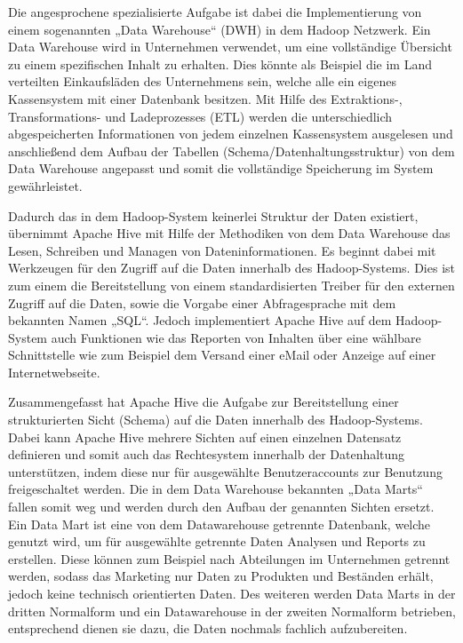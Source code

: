 Die angesprochene spezialisierte Aufgabe ist dabei die Implementierung von
einem sogenannten „Data Warehouse“ (DWH) in dem Hadoop Netzwerk. Ein Data
Warehouse wird in Unternehmen verwendet, um eine vollständige Übersicht zu
einem spezifischen Inhalt zu erhalten. Dies könnte als Beispiel die im Land
verteilten Einkaufsläden des Unternehmens sein, welche alle ein eigenes
Kassensystem mit einer Datenbank besitzen. Mit Hilfe des Extraktions-,
Transformations- und Ladeprozesses (ETL) werden die unterschiedlich
abgespeicherten Informationen von jedem einzelnen Kassensystem ausgelesen und
anschließend dem Aufbau der Tabellen (Schema/Datenhaltungsstruktur) von dem
Data Warehouse angepasst und somit die vollständige Speicherung im System
gewährleistet.

Dadurch das in dem Hadoop-System keinerlei Struktur der Daten existiert,
übernimmt Apache Hive mit Hilfe der Methodiken von dem Data Warehouse das
Lesen, Schreiben und Managen von Dateninformationen. Es beginnt dabei mit
Werkzeugen für den Zugriff auf die Daten innerhalb des Hadoop-Systems. Dies ist
zum einem die Bereitstellung von einem standardisierten Treiber für den
externen Zugriff auf die Daten, sowie die Vorgabe einer Abfragesprache mit dem
bekannten Namen „SQL“. Jedoch implementiert Apache Hive auf dem Hadoop-System
auch Funktionen wie das Reporten von Inhalten über eine wählbare Schnittstelle
wie zum Beispiel dem Versand einer eMail oder Anzeige auf einer
Internetwebseite.

Zusammengefasst hat Apache Hive die Aufgabe zur Bereitstellung einer strukturierten
Sicht (Schema) auf die Daten innerhalb des Hadoop-Systems. Dabei kann Apache
Hive mehrere Sichten auf einen einzelnen Datensatz definieren und somit auch
das Rechtesystem innerhalb der Datenhaltung unterstützen, indem diese nur
für ausgewählte Benutzeraccounts zur Benutzung freigeschaltet werden. Die in
dem Data Warehouse bekannten „Data Marts“ fallen somit weg und werden durch
den Aufbau der genannten Sichten ersetzt. Ein Data Mart ist eine von dem
Datawarehouse getrennte Datenbank, welche genutzt wird, um für ausgewählte
getrennte Daten Analysen und Reports zu erstellen. Diese können zum Beispiel
nach Abteilungen im Unternehmen getrennt werden, sodass das Marketing nur Daten
zu Produkten und Beständen erhält, jedoch keine technisch orientierten Daten.
Des weiteren werden Data Marts in der dritten Normalform und ein Datawarehouse
in der zweiten Normalform betrieben, entsprechend dienen sie dazu, die Daten
nochmals fachlich aufzubereiten.
\nl%


